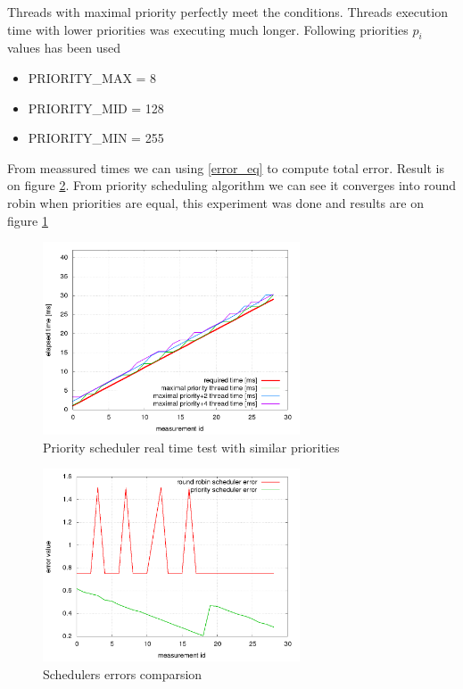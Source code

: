 \documentclass[conference]{IEEEtran}
\begin{document}
Threads with maximal priority perfectly meet the conditions. Threads execution time with lower priorities was executing much longer. Following priorities $p_i$ values has been used

\begin{itemize}
	\item PRIORITY\_MAX = 8		
	\item PRIORITY\_MID = 128
	\item PRIORITY\_MIN = 255
\end{itemize}

From meassured times we can using \ref{error_eq} to compute total error. Result is on figure \ref{fig_error}. From priority scheduling algorithm we can see it converges into round robin when priorities are equal, this experiment was done and results are on figure \ref{fig_priority_scheduler_similar_priority}


\begin{figure}[]
\centering
\includegraphics[width=3.0in]{priority_scheduler_similar_priority.png}
\caption{Priority scheduler real time test with similar priorities}
\label{fig_priority_scheduler_similar_priority}
\end{figure}


\begin{figure}[!b]
\centering
\includegraphics[width=3.0in]{scheduler_error.png}
\caption{Schedulers errors comparsion}
\label{fig_error}
\end{figure}
\end{document}
